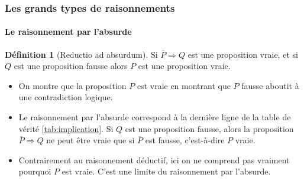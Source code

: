 \documentclass[10pt,notheorems]{beamer}
\theoremstyle{plain}
\theoremstyle{definition} %
\newtheorem{definition}{Définition}
\begin{document}
\begin{frame}
  \frametitle{Les grands types de raisonnements}
  \framesubtitle{Le raisonnement par l'absurde}
  \hypertarget{slide_raisonnement_par_l_absurde_1}{}

  \begin{definition}[Reductio ad absurdum]
    Si $\overline P\Rightarrow Q$ est une proposition vraie, et si $Q$ est une
    proposition fausse alors $P$ est une proposition vraie.
  \end{definition}

  \bigskip

  \begin{itemize}

  \item On montre que la proposition $P$ est vraie en montrant que $P$ fausse aboutit à une contradiction logique.\newline

  \item Le raisonnement par l'absurde correspond à la dernière ligne de la
    table de vérité \hyperlink{slide_implication_1}{\ref{tab:implication}}. Si $Q$ est une proposition fausse, alors la proposition $\overline P\Rightarrow Q$ ne peut être vraie que si $\overline P$ est fausse, c'est-à-dire $P$ vraie.\newline

  \item Contrairement au raisonnement déductif, ici on ne comprend pas vraiment pourquoi $P$ est vraie. C'est une limite du raisonnement par l'absurde.

  \end{itemize}
\end{frame}
\end{document}
